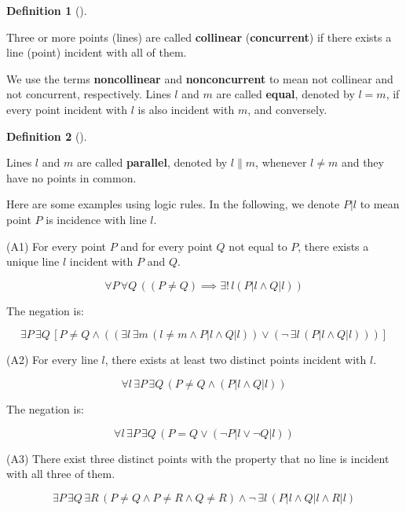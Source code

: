 \documentclass[
  twoside,
  12pt,
  letterpaper,
  fleqn]{article}
\theoremstyle{definition}
\newtheorem{definition}{Definition}[section]
\theoremstyle{definition}
\theoremstyle{plain}
\theoremstyle{plain}
\theoremstyle{remark}
\begin{document}
\begin{definition}[]\protect\hypertarget{def-collinear-concurrent}{}\label{def-collinear-concurrent}

Three or more points (lines) are called \textbf{collinear}
(\textbf{concurrent}) if there exists a line (point) incident with all
of them.

\end{definition}

We use the terms \textbf{noncollinear} and \textbf{nonconcurrent} to
mean not collinear and not concurrent, respectively. Lines \(l\) and
\(m\) are called \textbf{equal}, denoted by \(l=m\), if every point
incident with \(l\) is also incident with \(m\), and conversely.

\begin{definition}[]\protect\hypertarget{def-parallel}{}\label{def-parallel}

Lines \(l\) and \(m\) are called \textbf{parallel}, denoted by
\(l\parallel m\), whenever \(l\neq m\) and they have no points in
common.

\end{definition}

Here are some examples using logic rules. In the following, we denote
\(P \vert l\) to mean point \(P\) is incidence with line \(l\).

(A1) For every point \(P\) and for every point \(Q\) not equal to \(P\),
there exists a unique line \(l\) incident with \(P\) and \(Q.\)

\[\forall P\, \forall Q\, ((P\neq Q)\implies \exists ! \, l (P|l \land Q| l))\]

The negation is:

\[\exists P \, \exists Q\, \left[ P\neq Q \land ( (\exists l \, \exists m \, (l\neq m \land P|l \land Q|l)) \lor (\neg \, \exists l \, (P|l \land Q|l) ) ) \right]\]

(A2) For every line \(l\), there exists at least two distinct points
incident with \(l\).

\[\forall l\, \exists P \, \exists Q \, (P\neq Q \land (P|l \land Q|l))\]

The negation is:

\[\forall l\, \exists P \, \exists Q \, (P=Q \lor ( \neg P|l \lor \neg Q|l))\]

(A3) There exist three distinct points with the property that no line is
incident with all three of them.

\[\exists P\, \exists Q\, \exists R\, (P\neq Q \land P\neq R \land Q\neq R) \land \neg \, \exists l\, (P|l \land Q|l \land R|l)\]
\end{document}
